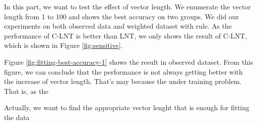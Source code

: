 In this part, we want to test the effect of vector length. We enumerate the vector length from 1 to 100 and shows the best accuracy on two groups. We did our experiments on both observed data and weighted dataset with rule. As the performance of C-LNT is better than LNT, we only shows the result of C-LNT, which is shown in Figure \ref{fig:sensitive}.

Figure \ref{fig:fitting-best-accuracy-1} shows the result in observed dataset.
From this figure, we can conclude that the performance is not always getting better with the increase of vector length. That's may because the under training problem. That is, as the

Actually, we want to find the appropriate vector lenght that is enough for fitting the data
